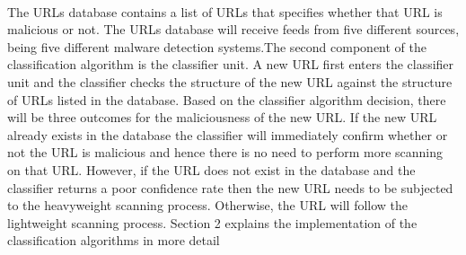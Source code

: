\paragraph{} 
The URLs database contains a list of URLs that specifies whether that URL is malicious or not. The URLs database will receive feeds from five different sources, being five different malware detection systems.The second component of the classification algorithm is the classifier unit. A new URL first enters the classifier unit and the classifier checks the structure of the new URL against the structure of URLs listed in the database. Based on the classifier algorithm decision, there will be three outcomes for the maliciousness of the new URL. If the new URL already exists in the database the classifier will immediately confirm whether or not the URL is malicious and hence there is no need to perform more scanning on that URL. However, if the URL does not exist in the database and the classifier returns a poor confidence rate then the new URL needs to be subjected to the heavyweight scanning process. Otherwise, the URL will follow the lightweight scanning process. Section 2 explains the implementation of the classification algorithms in more detail

